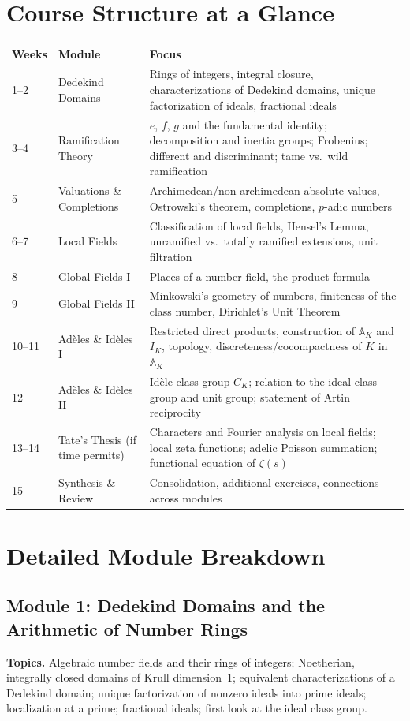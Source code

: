 \documentclass[11pt]{article}
\begin{document}
\section{Course Structure at a Glance}

\begin{longtable}{@{}p{1.6cm}p{4.2cm}p{8.7cm}@{}}
\toprule
\textbf{Weeks} & \textbf{Module} & \textbf{Focus} \\
\midrule
\endhead
1--2 & Dedekind Domains & Rings of integers, integral closure, characterizations of Dedekind domains, unique factorization of ideals, fractional ideals \\
3--4 & Ramification Theory & $e$, $f$, $g$ and the fundamental identity; decomposition and inertia groups; Frobenius; different and discriminant; tame vs.\ wild ramification \\
5 & Valuations \& Completions & Archimedean/non-archimedean absolute values, Ostrowski's theorem, completions, $p$-adic numbers \\
6--7 & Local Fields & Classification of local fields, Hensel's Lemma, unramified vs.\ totally ramified extensions, unit filtration \\
8 & Global Fields I & Places of a number field, the product formula \\
9 & Global Fields II & Minkowski's geometry of numbers, finiteness of the class number, Dirichlet's Unit Theorem \\
10--11 & Adèles \& Idèles I & Restricted direct products, construction of $\mathbb{A}_K$ and $I_K$, topology, discreteness/cocompactness of $K$ in $\mathbb{A}_K$ \\
12 & Adèles \& Idèles II & Idèle class group $C_K$; relation to the ideal class group and unit group; statement of Artin reciprocity \\
13--14 & Tate's Thesis (if time permits) & Characters and Fourier analysis on local fields; local zeta functions; adelic Poisson summation; functional equation of $\zeta(s)$ \\
15 & Synthesis \& Review & Consolidation, additional exercises, connections across modules \\
\bottomrule
\end{longtable}

\section{Detailed Module Breakdown}

\subsection*{Module 1: Dedekind Domains and the Arithmetic of Number Rings}
\textbf{Topics.} Algebraic number fields and their rings of integers; Noetherian, integrally closed domains of Krull dimension~1; equivalent characterizations of a Dedekind domain; unique factorization of nonzero ideals into prime ideals; localization at a prime; fractional ideals; first look at the ideal class group.
\end{document}
